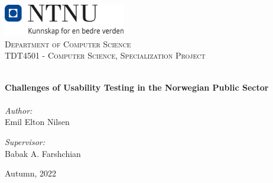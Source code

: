 
\begin{titlepage}
\vbox{ }
\vbox{ }
\begin{center}
\includegraphics[width=0.40\textwidth]{Images/NTNU_logo.png}\\[1cm]
\textsc{\LARGE Department of Computer Science}\\[1.5cm]
\textsc{\Large TDT4501 - Computer Science, Specialization Project}\\[0.5cm]
\vbox{ }

\HRule \\[0.4cm]
{ \huge \bfseries Challenges of Usability Testing in the Norwegian Public Sector}\\[0.4cm]
\HRule \\[1.5cm]

\large
\emph{Author:}\\
Emil Elton Nilsen

\emph{Supervisor:}\\
Babak A. Farshchian
\vfill

{\large Autumn, 2022}
\end{center}
\end{titlepage}